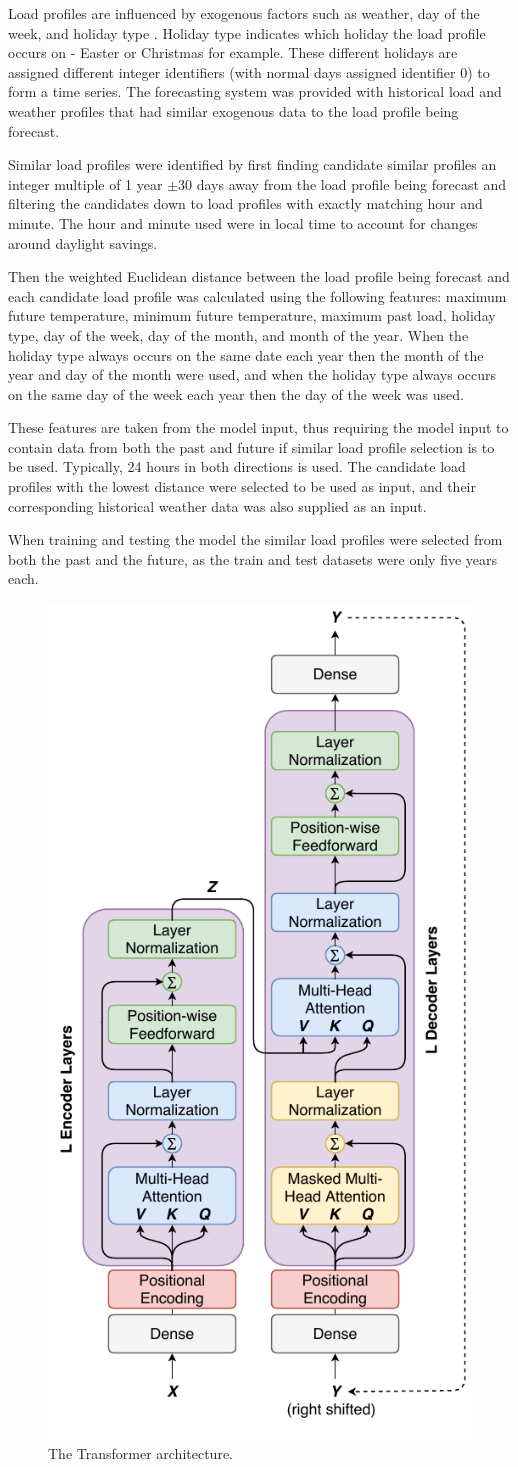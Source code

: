 \documentclass[conference]{IEEEtran}
\begin{document}
Load profiles are influenced by exogenous factors such as weather, day of the week, and holiday type \cite{Weron2006}.
Holiday type indicates which holiday the load profile occurs on - Easter or Christmas for example.
These different holidays are assigned different integer identifiers (with normal days assigned identifier 0) to form a time series.
The forecasting system was provided with historical load and weather profiles that had similar exogenous data to the load profile being forecast.

Similar load profiles were identified by first finding candidate similar profiles an integer multiple of 1 year $\pm$30 days away from the load profile being forecast and filtering the candidates down to load profiles with exactly matching hour and minute.
The hour and minute used were in local time to account for changes around daylight savings.

Then the weighted Euclidean distance between the load profile being forecast and each candidate load profile was calculated using the following features: 
maximum future temperature, 
minimum future temperature,
maximum past load,
holiday type, 
day of the week,
day of the month, and
month of the year.
When the holiday type always occurs on the same date each year then the month of the year and day of the month were used, and when the holiday type always occurs on the same day of the week each year then the day of the week was used.

These features are taken from the model input, thus requiring the model input to contain data from both the past and future if similar load profile selection is to be used.
Typically, 24 hours in both directions is used.
The candidate load profiles with the lowest distance were selected to be used as input, and their corresponding historical weather data was also supplied as an input.
\par
When training and testing the model the similar load profiles were selected from both the past and the future, as the train and test datasets were only five years each.

\begin{figure}[htbp]
	\centerline{\includegraphics[width=.35\textwidth]{images/transformer.pdf}}
	\caption{The Transformer architecture.}
	\label{fig:transformer}
\end{figure}
\end{document}
